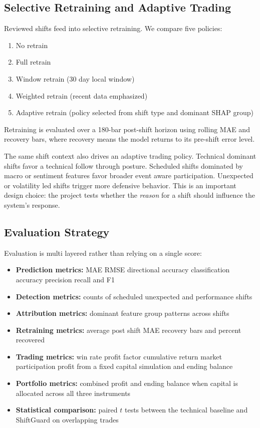 \documentclass[11pt]{article}
\begin{document}
\subsection{Selective Retraining and Adaptive Trading}
Reviewed shifts feed into selective retraining. We compare five policies:
\begin{enumerate}
    \item No retrain
    \item Full retrain
    \item Window retrain (30 day local window)
    \item Weighted retrain (recent data emphasized)
    \item Adaptive retrain (policy selected from shift type and dominant SHAP group)
\end{enumerate}

Retraining is evaluated over a 180-bar post-shift horizon using rolling MAE and recovery bars, where recovery means the model returns to its pre-shift error level.

The same shift context also drives an adaptive trading policy. Technical dominant shifts favor a technical follow through posture. Scheduled shifts dominated by macro or sentiment features favor broader event aware participation. Unexpected or volatility led shifts trigger more defensive behavior. This is an important design choice: the project tests whether the \emph{reason} for a shift should influence the system's response.

\subsection{Evaluation Strategy}
Evaluation is multi layered rather than relying on a single score:
\begin{itemize}
    \item \textbf{Prediction metrics:} MAE RMSE directional accuracy classification accuracy precision recall and F1
    \item \textbf{Detection metrics:} counts of scheduled unexpected and performance shifts
    \item \textbf{Attribution metrics:} dominant feature group patterns across shifts
    \item \textbf{Retraining metrics:} average post shift MAE recovery bars and percent recovered
    \item \textbf{Trading metrics:} win rate profit factor cumulative return market participation profit from a fixed capital simulation and ending balance
    \item \textbf{Portfolio metrics:} combined profit and ending balance when capital is allocated across all three instruments
    \item \textbf{Statistical comparison:} paired $t$ tests between the technical baseline and ShiftGuard on overlapping trades
\end{itemize}
\end{document}
